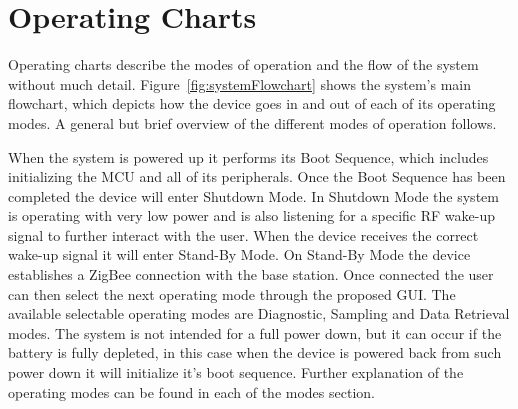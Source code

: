 \section{Operating Charts}
Operating charts describe the modes of operation and the flow of the system without much detail. Figure~\ref{fig:systemFlowchart} shows the system's main flowchart, which depicts how the device goes in and out of each of its operating modes.  A general but brief overview of the different modes of operation follows.

When the system is powered up it performs its Boot Sequence, which includes initializing the MCU and all of its peripherals. Once the Boot Sequence has been completed the device will enter Shutdown Mode. In Shutdown Mode the system is operating with very low power and is also listening for a specific RF wake-up signal to further interact with the user. When the device receives the correct wake-up signal it will enter Stand-By Mode. On Stand-By Mode the device establishes a ZigBee connection with the base station. Once connected the user can then select the next operating mode through the proposed GUI. The available selectable operating modes are Diagnostic, Sampling and Data Retrieval modes. The system is not intended for a full power down, but it can occur if the battery is fully depleted, in this case when the device is powered back from such power down it will initialize it's boot sequence. Further explanation of the operating modes can be found in each of the modes section.

